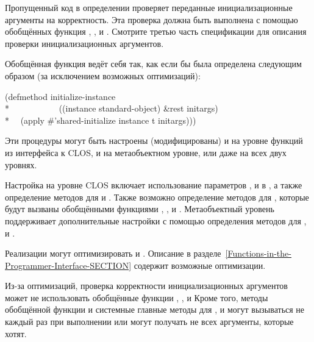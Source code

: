 Пропущенный код в определении  проверяет переданные
инициализационные аргументы на корректность. Эта проверка должна быть выполнена
с помощью обобщённых функция ,
,  и
. Смотрите третью часть спецификации для описания
проверки инициализационных аргументов.

Обобщённая функция ведёт себя так, как если бы была определена следующим образом
(за исключением возможных оптимизаций):

\begin{lisp}
(defmethod initialize-instance \\*
~~~~~~~~~~~((instance standard-object) \&rest initargs) \\*
~~(apply \#'shared-initialize instance t initargs)))
\end{lisp}

Эти процедуры могут быть настроены (модифицированы) и на уровне функций из
интерфейса к CLOS, и на метаобъектном уровне, или даже на всех двух уровнях.

Настройка на уровне CLOS включает использование параметров ,
 и  в , а также определение
методов для  и . Также возможно
определение методов для , которые будут вызваны
обобщёнными функциями , 
, 
 и
. Метаобъектный уровень поддерживает дополнительные
настройки с помощью определения методов для ,
 и . 

Реализации могут оптимизировать  и
. Описание  в
разделе~\ref{Functions-in-the-Programmer-Interface-SECTION} содержит возможные
оптимизации.

Из-за оптимизаций, проверка корректности инициализационных аргументов может не
использовать обобщённые функции ,
,  и
  Кроме того, методы обобщённой функции
 и системные главные методы для ,
 и  могут вызываться не каждый
раз при выполнении  или могут получать не всех аргументы,
которые хотят.

